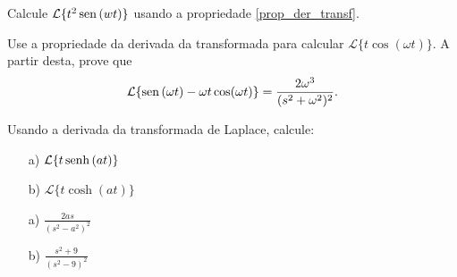 \begin{exer}Calcule $\mathcal{L}\{t^2\operatorname{sen}\,(wt)\}$ usando a propriedade \ref{prop_der_transf}.
\end{exer}
\begin{exer}
Use a propriedade da derivada da transformada para calcular $\displaystyle \mathcal{L}\{ t \cos (\omega t) \}$. A partir desta, prove que \begin{equation} \mathcal{L}\{ \operatorname{sen}\, (\omega t) - \omega t \cos (\omega t) \} = \frac{2 \omega^3 }{(s^2 + \omega^2)^2}. \end{equation}
\end{exer}
\begin{exer}
Usando a derivada da transformada de Laplace, calcule:
\begin{itemize}
  \item[a)] $\displaystyle \mathcal{L} \{ t \operatorname{senh}\, (at) \}$
  \item[b)] $\displaystyle \mathcal{L} \{ t \cosh (at) \}$
\end{itemize}
\end{exer}
\begin{resp}
 \begin{itemize}
  \item[a)] $\displaystyle \frac{2as}{(s^2 - a^2)^2}$
  \item[b)] $\displaystyle \frac{s^2 + 9}{(s^2 - 9)^2}$
 \end{itemize}
\end{resp}

